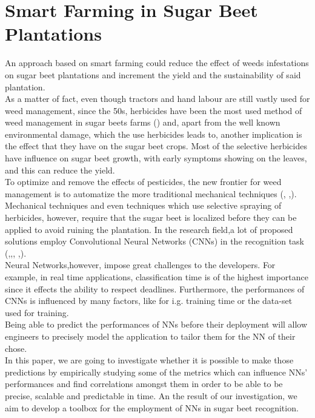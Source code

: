 \section{Smart Farming in Sugar Beet Plantations}
An approach based on smart farming could reduce the effect of weeds infestations on sugar beet plantations and  increment the yield and the sustainability of said plantation.\\
As a matter of fact, even though tractors and hand labour are still vastly used for weed management, since the 50s, herbicides have been the most used method of weed management in sugar beets farms (\cite{cioni_weed_2010}) and, apart from the well known environmental damage, which the use herbicides leads to, another implication is the effect that they have on the sugar beet crops. Most of the selective herbicides have influence on sugar beet growth, with early symptoms showing on the leaves, and this can reduce the yield. \cite{petersen_review_2004}\\
To optimize and remove the effects of pesticides, the new frontier for weed management is to automatize the more traditional mechanical techniques (\cite{raja_real-time_2020}, \cite{frasconi_design_2014},\cite{machleb_sensor-based_2021}).\\
Mechanical techniques and even techniques which use selective spraying of herbicides, however, require that the sugar beet is localized before they can be applied to avoid ruining the plantation. In the research field,a lot of proposed solutions employ Convolutional Neural Networks (CNNs) in the recognition task (\cite{gao_deep_2020},\cite{suh_transfer_2018},\cite{ramirez_deep_2020}, \cite{milioto2017real},\cite{agriculture11111111}).\\
Neural Networks,however, impose great challenges to the developers. For example, in real time applications, classification time is of the highest importance since it effects the ability to respect deadlines. Furthermore, the performances of CNNs is influenced by many factors, like for i.g. training time or the data-set used for training.\\ %
Being able to predict the performances of NNs before their deployment will allow engineers to precisely model the application to tailor them for the NN of their chose. \\
In this paper, we are going to investigate whether it is possible to make those predictions by empirically studying some of the metrics which can influence NNs' performances and find correlations amongst them in order to be able to be precise, scalable and predictable in time. An the result of our investigation, we aim to develop a toolbox for the employment of NNs in sugar beet recognition.

